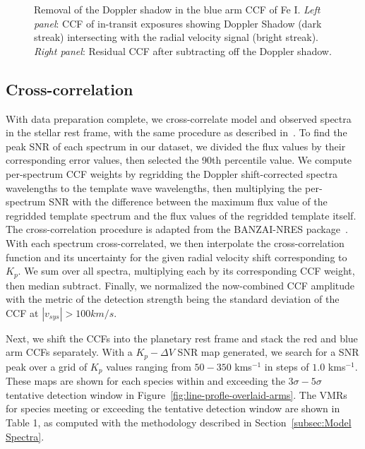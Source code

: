 \documentclass[twocolumn]{aastex631}
\begin{document}
\begin{figure}[ht!]
\begin{minipage}[b]{0.45\textwidth}
                    \label{fig:raw-ccf-after-Fe-blue}
                \end{minipage}
                \caption{Removal of the Doppler shadow in the blue arm CCF of Fe I. \textit{Left panel}: CCF of in-transit exposures showing Doppler Shadow (dark streak) intersecting with the radial velocity signal (bright streak). \textit{Right panel}: Residual CCF after subtracting off the Doppler shadow.}
                \label{fig:raw-CCFs}
            \end{figure}
            
            
        \subsection{Cross-correlation}
            With data preparation complete, we cross-correlate model and observed spectra in the stellar rest frame, with the same procedure as described in~\citet{Johnson2023}. To find the peak SNR of each spectrum in our dataset, we divided the flux values by their corresponding error values, then selected the 90th percentile value. We compute per-spectrum CCF weights by regridding the Doppler shift-corrected spectra wavelengths to the template wave wavelengths, then multiplying the per-spectrum SNR with the difference between the maximum flux value of the regridded template spectrum and the flux values of the regridded template itself. The cross-correlation procedure is adapted from the BANZAI-NRES package~\citep{McCully2022}. With each spectrum cross-correlated, we then interpolate the cross-correlation function and its uncertainty for the given radial velocity shift corresponding to $K_p$. We sum over all spectra, multiplying each by its corresponding CCF weight, then median subtract. Finally, we normalized the now-combined CCF amplitude with the metric of the detection strength being the standard deviation of the CCF at $|v_{sys}| > 100 km/s$.
            
            Next, we shift the CCFs into the planetary rest frame and stack the red and blue arm CCFs separately. With a ${K_p-\Delta\!V}$ SNR map generated, we search for a SNR peak over a grid of $K_p$ values ranging from $50-350$ kms$^{-1}$ in steps of $1.0$ kms$^{-1}$. These maps are shown for each species within and exceeding the ${3\sigma}-{5\sigma}$ tentative detection window in Figure~\ref{fig:line-profle-overlaid-arms}. The VMRs for species meeting or exceeding the tentative detection window are shown in Table 1, as computed with the methodology described in Section~\ref{subsec:Model Spectra}.
\end{document}
